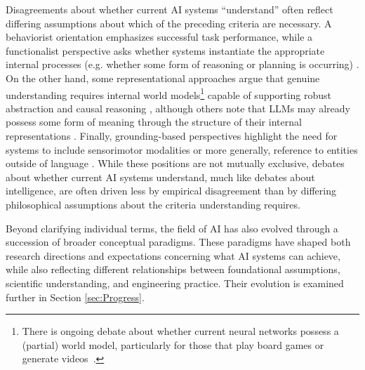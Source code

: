 \documentclass{article}
\begin{document}
Disagreements about whether current AI systems ``understand'' often reflect differing assumptions about which of the preceding criteria are necessary.
A behaviorist orientation emphasizes successful task performance, while a functionalist perspective asks whether systems instantiate the appropriate internal processes (e.g. whether some form of reasoning or planning is occurring) \cite{Bengio2019FromSystem1to2}.
On the other hand, some representational approaches argue that genuine understanding requires internal world models\footnote{There is ongoing debate about whether current neural networks possess a (partial) world model, particularly for those that play board games \cite{Li2023EmergentWorldRepresentations} or generate videos~\cite{ParkerHolder2025Genie3}.} capable of supporting robust abstraction and causal reasoning \cite{LeCun2022PathAMI, Alter2024LeCunTIME}, although others note that LLMs may already possess some form of meaning through the structure of their internal representations \cite{PiantadosiHill2022Meaning}.
Finally, grounding-based perspectives highlight the need for systems to include sensorimotor modalities \cite{Xu2025Grounding} or more generally, reference to entities outside of language \cite{bender-koller-2020-climbing}.
While these positions are not mutually exclusive, debates about whether current AI systems understand, much like debates about intelligence, are often driven less by empirical disagreement than by differing philosophical assumptions about the criteria understanding requires.

Beyond clarifying individual terms, the field of AI has also evolved through a succession of broader conceptual paradigms.
These paradigms have shaped both research directions and expectations concerning what AI systems can achieve, while also reflecting different relationships between foundational assumptions, scientific understanding, and engineering practice.
Their evolution is examined further in Section \ref{sec:Progress}.
\end{document}
